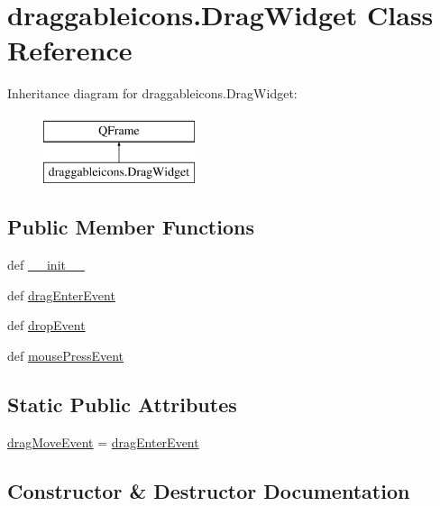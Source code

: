 \hypertarget{classdraggableicons_1_1DragWidget}{}\section{draggableicons.\+Drag\+Widget Class Reference}
\label{classdraggableicons_1_1DragWidget}
Inheritance diagram for draggableicons.\+Drag\+Widget\+:\begin{figure}[H]
\begin{center}
\leavevmode
\includegraphics[height=2.000000cm]{classdraggableicons_1_1DragWidget}
\end{center}
\end{figure}
\subsection*{Public Member Functions}
\begin{DoxyCompactItemize}
\item 
def \hyperlink{classdraggableicons_1_1DragWidget_ae9f2ab1210077e8f257cd48abcf08e89}{\+\_\+\+\_\+init\+\_\+\+\_\+}
\item 
def \hyperlink{classdraggableicons_1_1DragWidget_a002d75f00deec0da67cd5c524887ffc7}{drag\+Enter\+Event}
\item 
def \hyperlink{classdraggableicons_1_1DragWidget_a638e2739bb8c33af82a43802f83bb847}{drop\+Event}
\item 
def \hyperlink{classdraggableicons_1_1DragWidget_a293e1514cf019ff9bf9753536fb1cc1e}{mouse\+Press\+Event}
\end{DoxyCompactItemize}
\subsection*{Static Public Attributes}
\begin{DoxyCompactItemize}
\item 
\hyperlink{classdraggableicons_1_1DragWidget_a24ef2dd860d9ea570f2b85469aa21b72}{drag\+Move\+Event} = \hyperlink{classdraggableicons_1_1DragWidget_a002d75f00deec0da67cd5c524887ffc7}{drag\+Enter\+Event}
\end{DoxyCompactItemize}


\subsection{Constructor \& Destructor Documentation}
\hypertarget{classdraggableicons_1_1DragWidget_ae9f2ab1210077e8f257cd48abcf08e89}{}
